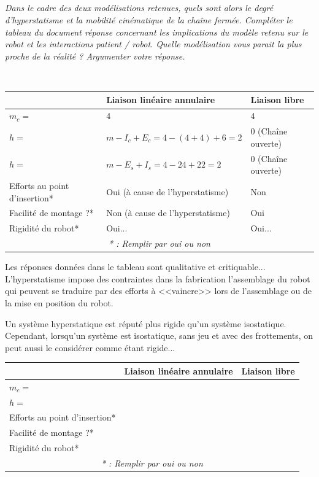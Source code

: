 \documentclass[10pt,fleqn]{article} %
\begin{document}
\begin{multicols}{2}
\fi

\subparagraph{}\textit{Dans le cadre des deux modélisations retenues, quels sont alors le degré d’hyperstatisme et la mobilité cinématique de la chaîne fermée. Compléter le tableau du document réponse concernant les
implications du modèle retenu sur le robot et les interactions patient / robot. Quelle modélisation vous
parait la plus proche de la réalité ? Argumenter votre réponse.}

\ifprof


\begin{corrige} ~\\
\footnotesize
\begin{center}
\begin{tabular}{|p{2.2cm}|p{2cm}|p{2cm}|}
\hline
& Liaison linéaire annulaire & Liaison libre  \\
\hline
$m_c=$ & 4 & 4\\ \hline
$h=$ & $m-I_c+E_c = 4 - (4+4) + 6 = 2$ &0 (Chaîne ouverte)\\ 
$h=$ & $m-E_s+I_s = 4 - 24 + 22 = 2$ &0 (Chaîne ouverte)\\ 
 \hline
Efforts au point d'insertion* & Oui (à cause de l'hyperstatisme)& Non \\ \hline
Facilité de montage ?* & Non (à cause de l'hyperstatisme)& Oui \\ \hline
Rigidité du robot* & Oui... &  Oui...\\ \hline
\multicolumn{3}{c}{\textit{* : Remplir par oui ou non}}
\end{tabular}
\end{center}
\normalsize
Les réponses données dans le tableau sont qualitative et critiquable... L'hyperstatisme impose des contraintes dans la fabrication l'assemblage du robot qui peuvent se traduire par des efforts à <<vaincre>> lors de l'assemblage ou de la mise en position du robot. 

Un système hyperstatique est réputé plus rigide qu'un système isostatique. Cependant, lorsqu'un système est isostatique, sans jeu et avec des frottements, on peut aussi le considérer comme étant rigide...
\end{corrige}
\else


\footnotesize
\begin{center}
\begin{tabular}{|p{2.2cm}|p{2cm}|p{2cm}|}
\hline
& Liaison linéaire annulaire & Liaison libre  \\
\hline
$m_c=$ & & \\ \hline
$h=$ & & \\ \hline
Efforts au point d'insertion* & & \\ \hline
Facilité de montage ?* & & \\ \hline
Rigidité du robot* & & \\ \hline
\multicolumn{3}{c}{\textit{* : Remplir par oui ou non}}
\end{tabular}
\end{center}
\normalsize
\fi



\end{multicols}
\end{document}
